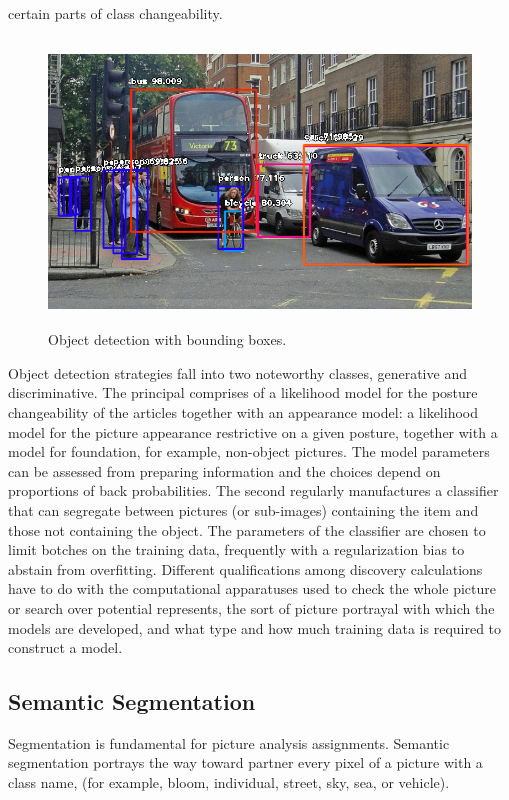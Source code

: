  certain parts of class changeability.
\begin{figure}[H]
  \centering
  \includegraphics[height=3in]{images/object_det.jpeg}
   \caption{Object detection with bounding boxes.}
\end{figure}

Object detection strategies fall into two noteworthy classes, generative and discriminative. The principal comprises of a likelihood model for the posture changeability of the articles together with an appearance model: a likelihood model for the picture appearance restrictive on a given posture, together with a model for foundation, for example, non-object pictures. The model parameters can be assessed from preparing information and the choices depend on proportions of back probabilities. The second regularly manufactures a classifier that can segregate between pictures (or sub-images) containing the item and those not containing the object. The parameters of the classifier are chosen to limit botches on the training data, frequently with a regularization bias to abstain from overfitting. Different qualifications among discovery calculations have to do with the computational apparatuses used to check the whole picture or search over potential represents, the sort of picture portrayal with which the models are developed, and what type and how much training data is required to construct a model.


\subsection{
Semantic Segmentation
}
Segmentation is fundamental for picture analysis assignments. Semantic segmentation portrays the way toward partner every pixel of a picture with a class name, (for example, bloom, individual, street, sky, sea, or vehicle). 

